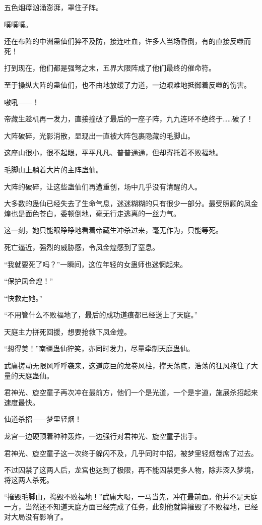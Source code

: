 \begin{this_body}
五色烟瘴汹涌澎湃，罩住子阵。

噗噗噗。

还在布阵的中洲蛊仙们猝不及防，接连吐血，许多人当场昏倒，有的直接反噬而死！

打到现在，他们都是强弩之末，五界大限阵成了他们最终的催命符。

至于操纵大阵的蛊仙们，也不由地放缓了力道，一边艰难地抵御着反噬的伤害。

嗷吼——！

帝藏生趁机再一发力，直接撞破了最后的一座子阵，九九连环不绝终于……破了！

大阵破碎，光影消散，显现出一直被大阵包裹隐藏的毛脚山。

这座山很小，很不起眼，平平凡凡、普普通通，但却寄托着不败福地。

毛脚山上躺着大片的主阵蛊仙。

大阵的破碎，让这些蛊仙们再遭重创，场中几乎没有清醒的人。

大多数的蛊仙已经失去了生命气息，迷迷糊糊的只有很少一部分。最受照顾的凤金煌也是面色苍白，委顿倒地，毫无行走逃离的一丝力气。

这一刻，她只能眼睁睁地看着帝藏生冲杀过来，毫无作为，只能等死。

死亡逼近，强烈的威胁感，令凤金煌感到了窒息。

“我就要死了吗？”一瞬间，这位年轻的女蛊师也迷惘起来。

“保护凤金煌！”

“快救走她。”

“不用管什么不败福地了，最后的成功道痕都已经送上了天庭。”

天庭主力拼死回援，想要抢救下凤金煌。

“想得美！”南疆蛊仙狞笑，亦同时发力，尽量牵制天庭蛊仙。

武庸搓动无限风呼呼袭来，这道庞巨的龙卷风柱，撑天荡底，浩荡的狂风拖住了大量的天庭蛊仙。

君神光、旋空童子再次冲在最前方，他们一个是光道，一个是宇道，施展杀招起来速度最快。

仙道杀招——梦里轻烟！

龙宫一边硬顶着种种轰炸，一边强行对君神光、旋空童子出手。

君神光、旋空童子这一次终于躲闪不及，几乎同时中招，被梦里轻烟卷席了过去。

不过囚禁了这两人后，龙宫也达到了极限，再不能囚禁更多人物，除非深入梦境，将这两人杀死。

“摧毁毛脚山，捣毁不败福地！”武庸大喝，一马当先，冲在最前面。他并不是天庭一方，当然还不知道天庭方面已经完成了任务，此刻他就算摧毁了不败福地，已经对大局没有影响了。


\end{this_body}

